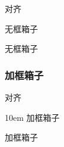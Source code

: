 \documentclass[twoside]{ctexart}
\begin{document}

            对齐
            \begin{minipage}[b][3em][t]{10em}
                无框箱子

                无框箱子
            \end{minipage}

        \subsubsection{加框箱子}


            对齐
            \begin{boxedminipage}[b][3em][t]{10em}
                加框箱子

                加框箱子
            \end{boxedminipage}
\end{document}

